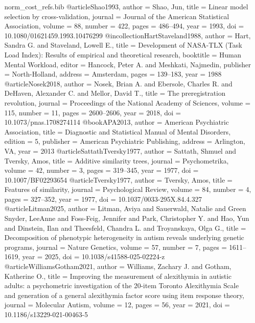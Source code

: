 \begin{filecontents}[overwrite]{norm_cost_refs.bib}
@article{Shao1993,
  author = {Shao, Jun},
  title = {Linear model selection by cross-validation},
  journal = {Journal of the American Statistical Association}, volume = {88}, number = {422}, pages = {486--494}, year = {1993},
  doi = {10.1080/01621459.1993.10476299}}
@incollection{HartStaveland1988,
  author = {Hart, Sandra G. and Staveland, Lowell E.},
  title = {Development of {NASA-TLX} ({Task Load Index}): Results of empirical and theoretical research},
  booktitle = {Human Mental Workload}, editor = {Hancock, Peter A. and Meshkati, Najmedin},
  publisher = {North-Holland}, address = {Amsterdam}, pages = {139--183}, year = {1988}}
@article{Nosek2018,
  author = {Nosek, Brian A. and Ebersole, Charles R. and DeHaven, Alexander C. and Mellor, David T.},
  title = {The preregistration revolution},
  journal = {Proceedings of the National Academy of Sciences}, volume = {115}, number = {11}, pages = {2600--2606}, year = {2018},
  doi = {10.1073/pnas.1708274114}}
@book{APA2013,
  author = {{American Psychiatric Association}},
  title = {Diagnostic and Statistical Manual of Mental Disorders},
  edition = {5}, publisher = {American Psychiatric Publishing}, address = {Arlington, VA}, year = {2013}}
@article{SattathTversky1977,
  author = {Sattath, Shmuel and Tversky, Amos},
  title = {Additive similarity trees},
  journal = {Psychometrika}, volume = {42}, number = {3}, pages = {319--345}, year = {1977},
  doi = {10.1007/BF02293654}}
@article{Tversky1977,
  author = {Tversky, Amos},
  title = {Features of similarity},
  journal = {Psychological Review}, volume = {84}, number = {4}, pages = {327--352}, year = {1977},
  doi = {10.1037/0033-295X.84.4.327}}
@article{Litman2025,
  author = {Litman, Aviya and Sauerwald, Natalie and Green Snyder, LeeAnne and Foss-Feig, Jennifer and Park, Christopher Y. and Hao, Yun and Dinstein, Ilan and Theesfeld, Chandra L. and Troyanskaya, Olga G.},
  title = {Decomposition of phenotypic heterogeneity in autism reveals underlying genetic programs},
  journal = {Nature Genetics}, volume = {57}, number = {7}, pages = {1611--1619}, year = {2025},
  doi = {10.1038/s41588-025-02224-z}}
@article{WilliamsGotham2021,
  author = {Williams, Zachary J. and Gotham, Katherine O.},
  title = {Improving the measurement of alexithymia in autistic adults: a psychometric investigation of the 20-item {Toronto Alexithymia Scale} and generation of a general alexithymia factor score using item response theory},
  journal = {Molecular Autism}, volume = {12}, pages = {56}, year = {2021},
  doi = {10.1186/s13229-021-00463-5}}

\end{filecontents}
